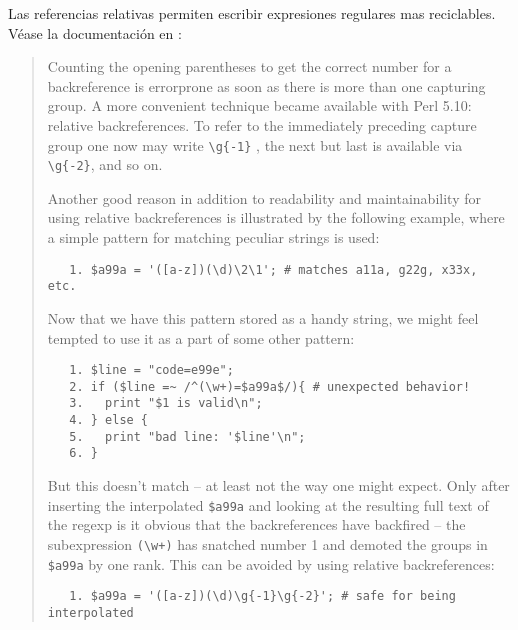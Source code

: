 
Las referencias relativas permiten escribir expresiones
regulares mas reciclables.
Véase la documentación
en 
:

\begin{it}
\begin{quotation}
Counting the opening parentheses to get the correct number for a
backreference is errorprone as soon as there is more than one capturing
group. A more convenient technique became available with Perl 5.10:
relative backreferences. To refer to the immediately preceding capture
group one now may write \verb|\g{-1}| , the next but last is available 
via \verb|\g{-2}|, and so on.

Another good reason in addition to readability and maintainability for
using relative backreferences is illustrated by the following example,
where a simple pattern for matching peculiar strings is used:

\begin{verbatim}
   1. $a99a = '([a-z])(\d)\2\1'; # matches a11a, g22g, x33x, etc.
\end{verbatim}

Now that we have this pattern stored as a handy string, we might feel
tempted to use it as a part of some other pattern:

\begin{verbatim}
   1. $line = "code=e99e";
   2. if ($line =~ /^(\w+)=$a99a$/){ # unexpected behavior!
   3.   print "$1 is valid\n";
   4. } else {
   5.   print "bad line: '$line'\n";
   6. }
\end{verbatim}

But this doesn't match -- at least not the way one might expect. Only
after inserting the interpolated \verb|$a99a| and looking at the resulting full
text of the regexp is it obvious that the backreferences have backfired --
the subexpression \verb|(\w+)| has snatched number 1 and demoted the groups in
\verb|$a99a| by one rank. This can be avoided by using relative backreferences:

\begin{verbatim}
   1. $a99a = '([a-z])(\d)\g{-1}\g{-2}'; # safe for being interpolated
\end{verbatim}
\end{quotation}
\end{it}

